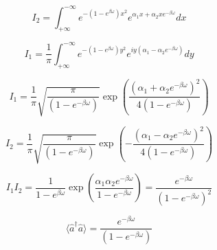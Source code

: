 \begin{problem}
	
		
		$$
		I_{2} =  \int_{+\infty}^{-\infty} e^{-(1-e^{\beta \omega})x^2} e^{\alpha_{1} x +\alpha_{2} x e^{-\beta \omega}} dx
		$$
		
		$$
		I_{1} = \frac{1}{\pi}\int_{+\infty}^{-\infty} e^{-(1-e^{\beta \omega})y^2} e^{iy(\alpha_{1}  -\alpha_{2}e^{-\beta \omega}) } dy
		$$
		
		$$
		I_1 = \frac{1}{\pi}\sqrt{\frac{\pi}{(1-e^{-\beta \omega})}} \exp(\frac{(\alpha_{1} +\alpha_{2} e^{-\beta \omega})^2}{4(1-e^{-\beta \omega})})
		$$
	
			
		$$
		I_2 = \frac{1}{\pi}\sqrt{\frac{\pi}{(1-e^{-\beta \omega})}} \exp(-\frac{(\alpha_{1} -\alpha_{2} e^{-\beta \omega})^2}{4(1-e^{-\beta \omega})})
		$$
		
		
		$$
		I_1 I_2  =  \frac{1}{1-e^{\beta \omega}} \exp(\frac{\alpha_{1} \alpha_{2} e^{-\beta \omega}}{1-e^{-\beta \omega}}) =
		\frac{e^{-\beta \omega} }{\left(1-e^{-\beta \omega}\right)^2} 
		$$


		$$
		\langle \hat{a}^{\dagger}\hat{a}\rangle = \frac{e^{-\beta \omega} }{\left(1-e^{-\beta \omega}\right)} 
		$$
		
\end{problem}	
